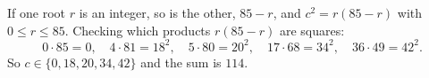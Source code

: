If one root $r$ is an integer, so is the other, $85-r$, and $c^2=r(85-r)$ with $0\le r\le85$. Checking which products $r(85-r)$ are squares:
\[0\cdot85=0,\quad4\cdot81=18^2,\quad5\cdot80=20^2,\quad17\cdot68=34^2,\quad36\cdot49=42^2.\]
So $c\in\{0,18,20,34,42\}$ and the sum is $\boxed{114}$.
